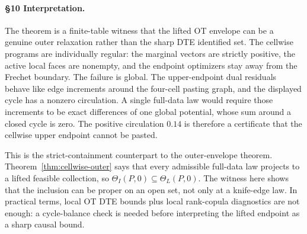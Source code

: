 \paragraph{\S10 Interpretation.}
The theorem is a finite-table witness that the lifted OT envelope can be a genuine outer relaxation rather than the sharp DTE identified set.  The cellwise programs are individually regular: the marginal vectors are strictly positive, the active local faces are nonempty, and the endpoint optimizers stay away from the Frechet boundary.  The failure is global.  The upper-endpoint dual residuals behave like edge increments around the four-cell pasting graph, and the displayed cycle has a nonzero circulation.  A single full-data law would require those increments to be exact differences of one global potential, whose sum around a closed cycle is zero.  The positive circulation \(0.14\) is therefore a certificate that the cellwise upper endpoint cannot be pasted.

This is the strict-containment counterpart to the outer-envelope theorem.  Theorem~\ref{thm:cellwise-outer} says that every admissible full-data law projects to a lifted feasible collection, so \(\Theta_I(P,0)\subseteq\Theta_L(P,0)\).  The witness here shows that the inclusion can be proper on an open set, not only at a knife-edge law.  In practical terms, local OT DTE bounds plus local rank-copula diagnostics are not enough: a cycle-balance check is needed before interpreting the lifted endpoint as a sharp causal bound.

